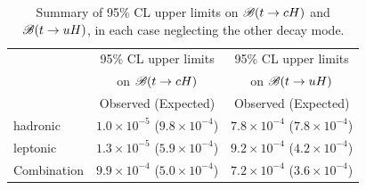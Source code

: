 
\begin{table}[t!]
\caption{\small{Summary of 95\% CL upper limits on $\mathscr{B}(t \to cH)$ and $\mathscr{B}(t \to uH)$, in each case neglecting the other decay mode. }}
\begin{center}
\begin{tabular}{lcc}
\toprule\toprule
 & \multicolumn{1}{c}{95\% CL upper limits} & \multicolumn{1}{c}{95\% CL upper limits}  \\
 & \multicolumn{1}{c}{on $\mathscr{B}(t \to cH)$} & \multicolumn{1}{c}{on $\mathscr{B}(t \to uH)$} \\
 &  Observed (Expected) & Observed (Expected)  \\
\midrule\midrule
hadronic  & $1.0 \times 10^{-5}$ ($9.8 \times 10^{-4}$) & $7.8 \times 10^{-4}$ ($7.8 \times 10^{-4}$) \\ 
leptonic  & $1.3 \times 10^{-5}$ ($5.9 \times 10^{-4}$) & $9.2 \times 10^{-4}$ ($4.2 \times 10^{-4}$) \\
\midrule
Combination  & $9.9 \times 10^{-4}$ ($5.0 \times 10^{-4}$) & $7.2 \times 10^{-4}$ ($3.6 \times 10^{-4}$) \\
\bottomrule\bottomrule
\end{tabular}
\label{tab:limits_summary}
\end{center}
\end{table}

